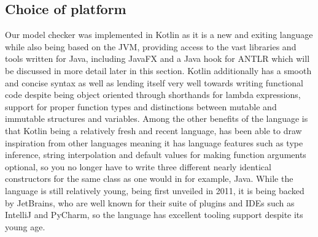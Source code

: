 




\subsection{Choice of platform}


Our model checker was implemented in Kotlin as it is a new and exiting language while also being based on the JVM, providing access to the vast libraries and tools written for Java, including JavaFX and a Java hook for ANTLR which will be discussed in more detail later in this section. Kotlin additionally has a smooth and concise syntax as well as lending itself very well towards writing functional code despite being object oriented through shorthands for lambda expressions, support for proper function types and distinctions between mutable and immutable structures and variables. Among the other benefits of the language is that Kotlin being a relatively fresh and recent language, has been able to draw inspiration from other languages meaning it has language features such as type inference, string interpolation and default values for making function arguments optional, so you no longer have to write three different nearly identical constructors for the same class as one would in for example, Java. While the language is still relatively young, being first unveiled in 2011\cite{KotlinHello}, it is being backed by JetBrains, who are well known for their suite of plugins and IDEs such as IntelliJ and PyCharm, so the language has excellent tooling support despite its young age.

